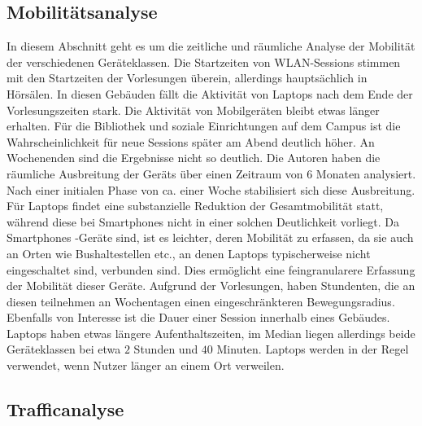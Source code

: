 \documentclass[12pt, a4paper]{article}
\begin{document}
\vfill
\pagebreak

\subsection{Mobilitätsanalyse}

In diesem Abschnitt geht es um die zeitliche und räumliche Analyse der Mobilität der verschiedenen Geräteklassen.
Die Startzeiten von WLAN-Sessions stimmen mit den Startzeiten der Vorlesungen überein, allerdings hauptsächlich in Hörsälen.
In diesen Gebäuden fällt die Aktivität von Laptops nach dem Ende der Vorlesungszeiten stark. Die Aktivität von Mobilgeräten
bleibt etwas länger erhalten. Für die Bibliothek und soziale Einrichtungen auf dem Campus ist die Wahrscheinlichkeit
für neue Sessions später am Abend deutlich höher. An Wochenenden sind die Ergebnisse nicht so deutlich.\newline
Die Autoren haben die räumliche Ausbreitung der Geräts über einen Zeitraum von 6 Monaten analysiert.
Nach einer initialen Phase von ca. einer Woche stabilisiert sich diese Ausbreitung. Für Laptops findet eine 
substanzielle Reduktion der Gesamtmobilität statt, während diese bei Smartphones nicht in einer solchen Deutlichkeit vorliegt.
Da Smartphones -Geräte sind, ist es leichter, deren Mobilität zu erfassen, da sie auch an Orten
wie Bushaltestellen etc., an denen Laptops typischerweise nicht eingeschaltet sind, verbunden sind.
Dies ermöglicht eine feingranularere Erfassung der Mobilität dieser Geräte. Aufgrund der Vorlesungen, 
haben Stundenten, die an diesen teilnehmen an Wochentagen einen eingeschränkteren Bewegungsradius.\newline
Ebenfalls von Interesse ist die Dauer einer Session innerhalb eines Gebäudes.
Laptops haben etwas längere Aufenthaltszeiten, im Median liegen allerdings beide Geräteklassen bei etwa $2$ Stunden
und $40$ Minuten. Laptops werden in der Regel verwendet, wenn Nutzer länger an einem Ort verweilen.

\subsection{Trafficanalyse}
\end{document}
